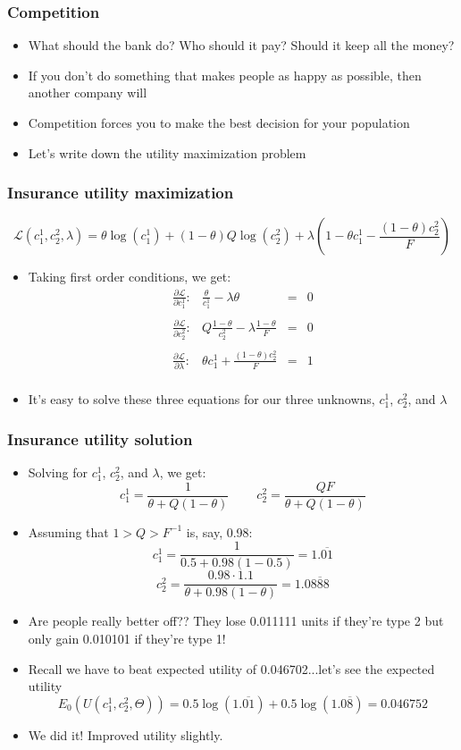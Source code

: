 \documentclass{beamer}
\begin{document}
\begin{frame}
\frametitle{Competition}
\begin{itemize}
\item<1->  What should the bank do?  Who should it pay?  Should it keep all the money?
\bigskip
\item<2-> If you don't do something that makes people as happy as possible, then another company will
\bigskip
\item<3-> Competition forces you to make the best decision for your population
\bigskip
\item<4-> Let's write down the utility maximization problem
\end{itemize}
\end{frame}

\begin{frame}
\frametitle{Insurance utility maximization}
$$\mathcal{L}(c_1^1,c_2^2,\lambda)=\theta \log(c_1^1)+(1-\theta)Q\log(c_2^2)+\lambda\left(1-\theta c_1^1-\frac{(1-\theta)c_2^2}{F}\right)$$
\begin{itemize}
\item Taking first order conditions, we get:
$$\begin{array}{lrcl}
\frac{\partial \mathcal{L}}{\partial c_1^1}: & \frac{\theta}{c_1^1}-\lambda\theta & = & 0 \\
\ \\
\frac{\partial \mathcal{L}}{\partial c_2^2}: & Q\frac{1-\theta}{c_2^2}-\lambda\frac{1-\theta}{F} & = & 0 \\
\ \\
\frac{\partial \mathcal{L}}{\partial \lambda}: & \theta c_1^1 + \frac{(1-\theta)c_2^2}{F}  & = & 1 \\
\end{array}$$
\bigskip
\item It's easy to solve these three equations for our three unknowns, $c_1^1$, $c_2^2$, and $\lambda$
\end{itemize}
\end{frame}

\begin{frame}
\frametitle{Insurance utility solution}
\begin{itemize}
\item Solving for $c_1^1$, $c_2^2$, and $\lambda$, we get:
$$c_1^1=\frac{1}{\theta+Q(1-\theta)}\ \ \ \ \ \ \ \ \ \ c_2^2=\frac{QF}{\theta+Q(1-\theta)}$$
\item<2-> Assuming that $1>Q>F^{-1}$ is, say, 0.98:
$$c_1^1=\frac{1}{0.5+0.98(1-0.5)}=1.\overline{01}$$
$$c_2^2=\frac{0.98\cdot 1.1}{\theta+0.98(1-\theta)}=1.0\overline{888}$$
\item<3-> Are people really better off?? They lose 0.011111 units if they're type 2 but only gain 0.010101 if they're type 1!
\item<4-> Recall we have to beat expected utility of 0.046702...let's see the expected utility
$$E_0(U(c_1^1,c_2^2,\Theta))=0.5\log(1.\overline{01})+0.5\log(1.0\overline{8})=0.046752$$
\item<5-> We did it!  Improved utility slightly.
\end{itemize}
\end{frame}
\end{document}
